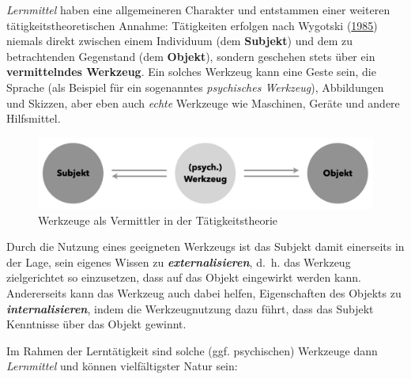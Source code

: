 \documentclass[
]{scrbook}
\theoremstyle{definition}
\theoremstyle{definition}
\theoremstyle{definition}
\theoremstyle{definition}
\theoremstyle{remark}
\begin{document}
\emph{Lernmittel} haben eine allgemeineren Charakter und entstammen einer weiteren tätigkeitstheoretischen Annahme: Tätigkeiten erfolgen nach Wygotski (\protect\hyperlink{ref-Wygotski1985a}{1985}) niemals direkt zwischen einem Individuum (dem \textbf{Subjekt}) und dem zu betrachtenden Gegenstand (dem \textbf{Objekt}), sondern geschehen stets über ein \textbf{vermittelndes Werkzeug}. Ein solches Werkzeug kann eine Geste sein, die Sprache (als Beispiel für ein sogenanntes \emph{psychisches Werkzeug}), Abbildungen und Skizzen, aber eben auch \emph{echte} Werkzeuge wie Maschinen, Geräte und andere Hilfsmittel.

\begin{figure}

{\centering \includegraphics[width=0.75\linewidth]{pictures/7-SubjektObjekt} 

}

\caption{Werkzeuge als Vermittler in der Tätigkeitstheorie}\label{fig:SubjektObjekt}
\end{figure}

Durch die Nutzung eines geeigneten Werkzeugs ist das Subjekt damit einerseits in der Lage, sein eigenes Wissen zu \textbf{\emph{externalisieren}}, d.~h. das Werkzeug zielgerichtet so einzusetzen, dass auf das Objekt eingewirkt werden kann. Andererseits kann das Werkzeug auch dabei helfen, Eigenschaften des Objekts zu \textbf{\emph{internalisieren}}, indem die Werkzeugnutzung dazu führt, dass das Subjekt Kenntnisse über das Objekt gewinnt.

Im Rahmen der Lerntätigkeit sind solche (ggf. psychischen) Werkzeuge dann \emph{Lernmittel} und können vielfältigster Natur sein:
\end{document}
